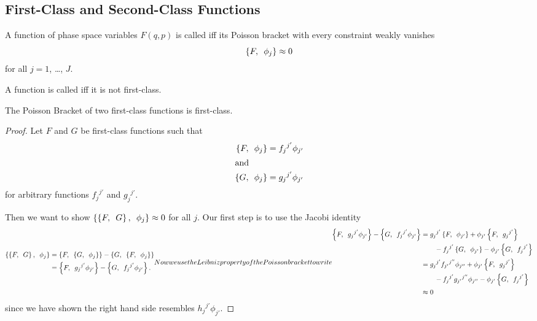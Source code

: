 \subsection{First-Class and Second-Class Functions}
\begin{defn}\label{defn:constrained:first-class}\label{defn:constrained:second-class}
A function of phase space variables $F(q,p)$ is called
 iff its Poisson bracket with every constraint
weakly vanishes
\begin{equation}
\left\{F,\enspace\phi_{j}\right\}\approx0
\end{equation}
for all $j=1$, \dots, $J$.

A function is called  iff it is not first-class.
\end{defn}

\begin{thm}
The Poisson Bracket of two first-class functions is first-class.
\end{thm}

\begin{proof}
Let $F$ and $G$ be first-class functions such that
\begin{subequations}
\begin{align}
\left\{F,\enspace\phi_{j}\right\} &= {f_{j}}^{j'}\phi_{j'}\\
\intertext{and}
\left\{G,\enspace\phi_{j}\right\} &= {g_{j}}^{j'}\phi_{j'}
\end{align}
\end{subequations}
for arbitrary functions ${f_{j}}^{j'}$ and ${g_{j}}^{j'}$.

Then we want to show
$\left\{\left\{F,\enspace G\right\},\enspace\phi_{j}\right\}\approx0$ for all
$j$. Our first step is to use the Jacobi identity
\begin{subequations}
\begin{align}
\PoissonBracket{\PoissonBracket{F}{G}}{\phi_{j}}&=
\PoissonBracket{F}{\PoissonBracket{G}{\phi_{j}}}
-\PoissonBracket{G}{\PoissonBracket{F}{\phi_{j}}}\\
&=\PoissonBracket{F}{{g_{j}}^{j'}\phi_{j'}}
-\PoissonBracket{G}{{f_{j}}^{j'}\phi_{j'}}.
\end{align}
Now we use the Leibniz property of the Poisson bracket to write
\begin{align}
\PoissonBracket{F}{{g_{j}}^{j'}\phi_{j'}}
-\PoissonBracket{G}{{f_{j}}^{j'}\phi_{j'}}
&= {g_{j}}^{j'}\PoissonBracket{F}{\phi_{j'}}
   +\phi_{j'}\PoissonBracket{F}{{g_{j}}^{j'}}\nonumber\\
&\qquad-{f_{j}}^{j'}\PoissonBracket{G}{\phi_{j'}}
   -\phi_{j'}\PoissonBracket{G}{{f_{j}}^{j'}}\\
&= {g_{j}}^{j'}{f_{j'}}^{j''}\phi_{j''}
   +\phi_{j'}\PoissonBracket{F}{{g_{j}}^{j'}}\nonumber\\
&\qquad-{f_{j}}^{j'}{g_{j'}}^{j''}\phi_{j''}
   -\phi_{j'}\PoissonBracket{G}{{f_{j}}^{j'}}\\
&\weakEq 0
\end{align}
\end{subequations}
since we have shown the right hand side resembles ${h_{j}}^{j'}\phi_{j'}$.
\end{proof}

